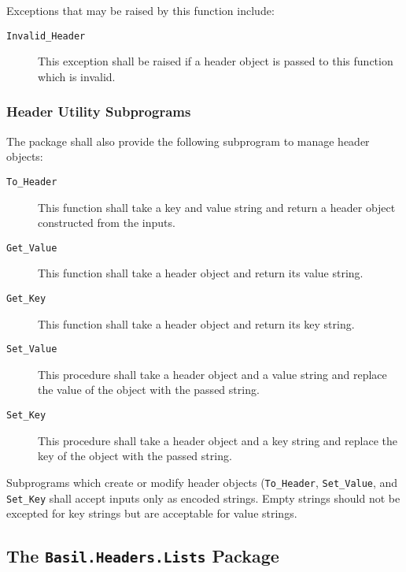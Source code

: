 \documentclass[11pt]{article}
\begin{document}
Exceptions that may be raised by this function include:

\begin{description}

\item[\texttt{Invalid\_Header}] This exception shall be raised if a
  header object is passed to this function which is invalid.

\end{description}

\subsubsection{Header Utility Subprograms}

The package shall also provide the following subprogram to manage
header objects:

\begin{description}

\item[\texttt{To\_Header}] This function shall take a key and value
  string and return a header object constructed from the inputs.
\item[\texttt{Get\_Value}] This function shall take a header object
  and return its value string.
\item[\texttt{Get\_Key}] This function shall take a header object and
  return its key string.
\item[\texttt{Set\_Value}] This procedure shall take a header object
  and a value string and replace the value of the object with the
  passed string.
\item[\texttt{Set\_Key}] This procedure shall take a header object and
  a key string and replace the key of the object with the passed
  string.

\end{description}

Subprograms which create or modify header objects
(\texttt{To\_Header}, \texttt{Set\_Value}, and \texttt{Set\_Key} shall
accept inputs only as encoded strings. Empty strings should not be
excepted for key strings but are acceptable for value strings.


\subsection{The \texttt{Basil.Headers.Lists} Package}
\label{sr:header-lists}
\end{document}
